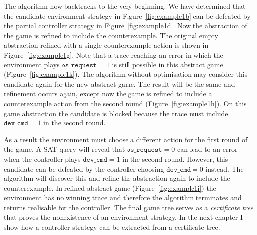 The algorithm now backtracks to the very beginning. We have determined that the candidate environment strategy in Figure~\ref{fig:example1b} can be defeated by the partial controller strategy in Figure~\ref{fig:example1d}. Now the abstraction of the game is refined to include the counterexample. The original empty abstraction refined with a single counterexample action is shown in Figure~\ref{fig:example1g}. Note that a trace reaching an error in which the environment plays $\texttt{os\_request} = 1$ is still possible in this abstract game (Figure~\ref{fig:example1k}). The algorithm without optimisation may consider this candidate again for the new abstract game. The result will be the same and refinement occurs again, except now the game is refined to include a counterexample action from the second round (Figure~\ref{fig:example1h}). On this game abstraction the candidate is blocked because the trace must include $\texttt{dev\_cmd} = 1$ in the second round.

As a result the environment must choose a different action for the first round of the game. A SAT query will reveal that $\texttt{os\_request} = 0$ can lead to an error when the controller plays $\texttt{dev\_cmd} = 1$ in the second round. However, this candidate can be defeated by the controller choosing $\texttt{dev\_cmd} = 0$ instead. The algorithm will discover this and refine the abstraction again to include the counterexample. In refined abstract game (Figure~\ref{fig:example1i}) the environment has no winning trace and therefore the algorithm terminates and returns realisable for the controller. The final game tree serves as a \emph{certificate tree} that proves the nonexistence of an environment strategy. In the next chapter I show how a controller strategy can be extracted from a certificate tree.


